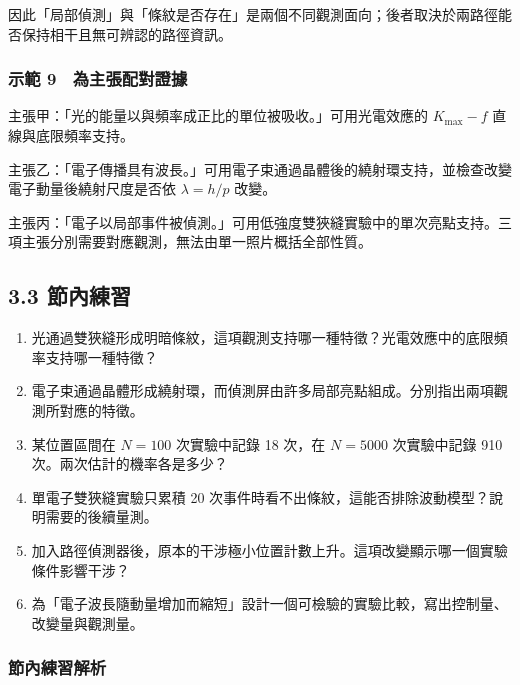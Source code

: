 \documentclass[11pt,a4paper]{article}
\providecommand{\tightlist}{%
  \setlength{\itemsep}{0pt}\setlength{\parskip}{0pt}}
\begin{document}
因此「局部偵測」與「條紋是否存在」是兩個不同觀測面向；後者取決於兩路徑能否保持相干且無可辨認的路徑資訊。

\subsubsection{示範 9　為主張配對證據}\label{ux793aux7bc4-9-ux70baux4e3bux5f35ux914dux5c0dux8b49ux64da}

主張甲：「光的能量以與頻率成正比的單位被吸收。」可用光電效應的 \(K_{\max}-f\) 直線與底限頻率支持。

主張乙：「電子傳播具有波長。」可用電子束通過晶體後的繞射環支持，並檢查改變電子動量後繞射尺度是否依 \(\lambda=h/p\) 改變。

主張丙：「電子以局部事件被偵測。」可用低強度雙狹縫實驗中的單次亮點支持。三項主張分別需要對應觀測，無法由單一照片概括全部性質。

\subsection{3.3 節內練習}\label{ux7bc0ux5167ux7df4ux7fd2-2}

\begin{enumerate}
\def\labelenumi{\arabic{enumi}.}
\tightlist
\item
  光通過雙狹縫形成明暗條紋，這項觀測支持哪一種特徵？光電效應中的底限頻率支持哪一種特徵？
\item
  電子束通過晶體形成繞射環，而偵測屏由許多局部亮點組成。分別指出兩項觀測所對應的特徵。
\item
  某位置區間在 \(N=100\) 次實驗中記錄 18 次，在 \(N=5000\) 次實驗中記錄 910 次。兩次估計的機率各是多少？
\item
  單電子雙狹縫實驗只累積 20 次事件時看不出條紋，這能否排除波動模型？說明需要的後續量測。
\item
  加入路徑偵測器後，原本的干涉極小位置計數上升。這項改變顯示哪一個實驗條件影響干涉？
\item
  為「電子波長隨動量增加而縮短」設計一個可檢驗的實驗比較，寫出控制量、改變量與觀測量。
\end{enumerate}

\subsubsection{節內練習解析}\label{ux7bc0ux5167ux7df4ux7fd2ux89e3ux6790-2}
\end{document}
